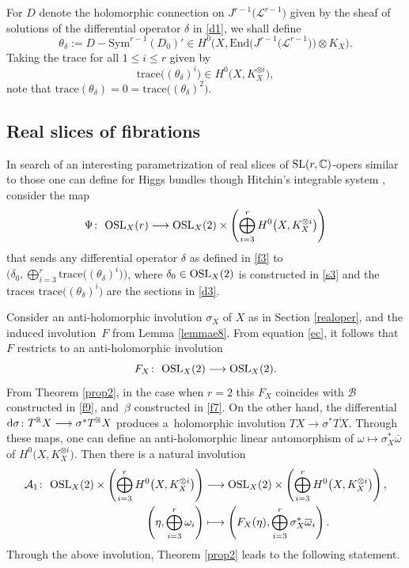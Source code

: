 \documentclass[10pt,a4paper]{amsart}
\numberwithin{equation}{section}
\begin{document}
For $D$ denote the holomorphic connection on $J^{r-1}\bigl({\mathcal L}^{r-1}\bigr)$ given by the sheaf of solutions of
the differential operator $\delta$ in \eqref{d1}, we shall define
\[
\theta_\delta := D- \text{Sym}^{r-1}(D_0)' \in H^0\bigl(X, \text{End}\bigl(J^{r-1}\bigl({\mathcal L}^{r-1}\bigr)\bigr)
\otimes K_X\bigr).
\]
Taking the trace for all $1 \leq i \leq r$ given by
\begin{equation}\label{d3}
\text{trace}\bigl((\theta_\delta)^i\bigr) \in H^0\bigl(X, K^{\otimes i}_X\bigr),
\end{equation}
note that $\text{trace}(\theta_\delta) = 0 = \text{trace}\bigl((\theta_\delta)^2\bigr)$.
\subsection{Real slices of fibrations}
In search of an interesting parametrization of real slices of ${\rm SL}(r,\mathbb{C})$-opers similar to those one can define for Higgs bundles though Hitchin's integrable system \cite{Hi}, consider the map
\begin{equation}\label{d2}
\Psi\colon\ {\rm OSL}_X(r) \longrightarrow {\rm OSL}_X(2)\times \left(\bigoplus_{i=3}^r H^0\bigl(X, K^{\otimes i}_X\bigr)\right)
\end{equation}
 that sends any differential operator $\delta$ as defined in \eqref{f3} to
$\bigl(\delta_0, \bigoplus_{i=3}^r \text{trace}\bigl((\theta_\delta)^i\bigr)\bigr)$, where ${\delta_0 \in {\rm OSL}_X(2)}$
is constructed in \eqref{s3} and the traces $\text{trace}\bigl((\theta_\delta)^i\bigr)$ are the sections in \eqref{d3}.

Consider an anti-holomorphic involution $\sigma_X$ of $X$ as in Section \ref{realoper}, and the induced involution~$F$
from Lemma \ref{lemmae8}. From equation \eqref{ec}, it follows that $F$ restricts to an anti-holomorphic involution
\[
F_X\colon\ {\rm OSL}_X(2) \longrightarrow {\rm OSL}_X(2).
\]
From Theorem \ref{prop2}, in the case when $r = 2$ this $F_X$ coincides with $\mathcal B$
constructed in \eqref{f9}, and~$\beta$ constructed in \eqref{f7}. On the other hand, the differential
${\rm d}\sigma\colon T^{\mathbb R}X \longrightarrow \sigma^*T^{\mathbb R}X$ produces a~holomorphic involution $TX \longrightarrow \sigma^*\overline{TX}$. Through these maps, one can define an anti-holomorphic
linear automorphism of $\omega \longmapsto \sigma^*_X\overline{\omega}$ of $H^0\bigl(X, K^{\otimes i}_X\bigr)$.
Then there is a natural involution
\begin{align}
{\mathcal A}_1\colon\ {\rm OSL}_X(2)\times \left(\bigoplus_{i=3}^r H^0\bigl(X, K^{\otimes i}_X\bigr)\right)&
\longrightarrow {\rm OSL}_X(2)\times \left(\bigoplus_{i=3}^r H^0\bigl(X, K^{\otimes i}_X\bigr)\right),\nonumber\\
\left(\eta, \bigoplus_{i=3}^r \omega_i\right)&\longmapsto \left(F_X(\eta),
\bigoplus_{i=3}^r \sigma^*_X\overline{\omega}_i\right). \label{d4}
\end{align}
Through the above involution, Theorem \ref{prop2} leads to the following statement.
\end{document}
